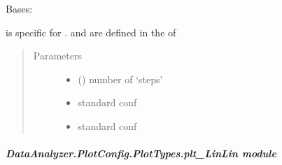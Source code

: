 \documentclass[letterpaper,10pt,english]{sphinxmanual}
\begin{document}
\begin{fulllineitems}
\label{\detokenize{DataAnalyzer.PlotConfig.PlotTypes:DataAnalyzer.PlotConfig.PlotTypes.plt_Hist.Hist}}
Bases: {\hyperref[\detokenize{DataAnalyzer.PlotConfig:DataAnalyzer.PlotConfig.plt_Base.Base}]{}}

 is specific for .  and  are defined in the  of 
\begin{quote}\begin{description}
\item[{Parameters}] \leavevmode\begin{itemize}
\item {} 
 () \textendash{} number of ‘steps’

\item {} 
 \textendash{} standard conf

\item {} 
 \textendash{} standard conf

\end{itemize}

\end{description}\end{quote}

\begin{fulllineitems}
\label{\detokenize{DataAnalyzer.PlotConfig.PlotTypes:DataAnalyzer.PlotConfig.PlotTypes.plt_Hist.Hist.plot}}
\end{fulllineitems}


\end{fulllineitems}



\subparagraph{DataAnalyzer.PlotConfig.PlotTypes.plt\_LinLin module}
\label{\detokenize{DataAnalyzer.PlotConfig.PlotTypes:module-DataAnalyzer.PlotConfig.PlotTypes.plt_LinLin}}\label{\detokenize{DataAnalyzer.PlotConfig.PlotTypes:dataanalyzer-plotconfig-plottypes-plt-linlin-module}}
\end{document}
